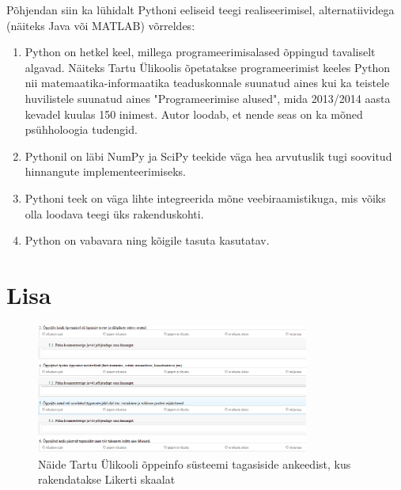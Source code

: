 \documentclass[a4paper,12pt]{article}
\numberwithin{equation}{section}
\theoremstyle{definition}
\begin{document}
Põhjendan siin ka lühidalt Pythoni eeliseid teegi realiseerimisel, alternatiividega (näiteks Java või MATLAB) võrreldes:
\begin{enumerate}
\item Python on hetkel keel, millega programeerimisalased õppingud tavaliselt algavad. Näiteks Tartu Ülikoolis õpetatakse programeerimist keeles Python nii matemaatika-informaatika teaduskonnale suunatud aines kui ka teistele huvilistele suunatud aines "Programeerimise alused", mida 2013/2014 aasta kevadel kuulas 150 inimest. Autor loodab, et nende seas on ka mõned psühholoogia tudengid.
\item Pythonil on läbi NumPy ja SciPy teekide väga hea arvutuslik tugi soovitud hinnangute implementeerimiseks.
\item Pythoni teek on väga lihte integreerida mõne veebiraamistikuga, mis võiks olla loodava teegi üks rakenduskohti.
\item Python on vabavara ning kõigile tasuta kasutatav.
\end{enumerate}



\pagebreak
\section{Lisa}

\begin{figure}[H]
\centering
\includegraphics[width=0.8\textwidth]{ois_tagasiside_toodeldud.png}
\caption{Näide Tartu \"Ulikooli õppeinfo s\"usteemi tagasiside ankeedist, kus rakendatakse Likerti skaalat \cite{UT}}
\label{likert1}
\end{figure}
\end{document}
